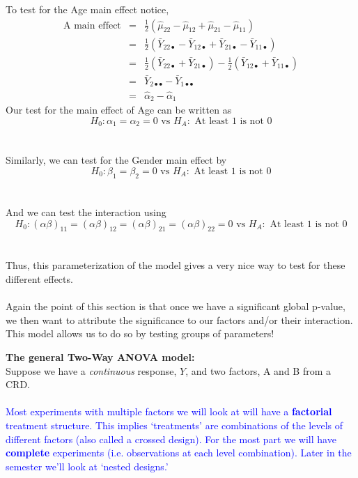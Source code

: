 To test for the Age main effect notice, 
\begin{eqnarray*}
\mbox{A main effect}&=&\frac{1}{2}(\hat{\mu}_{22}-\hat{\mu}_{12}+\hat{\mu}_{21}-\hat{\mu}_{11})\\
&= & \frac{1}{2}(\bar{Y}_{22\bullet}-\bar{Y}_{12\bullet}+\bar{Y}_{21\bullet}-\bar{Y}_{11\bullet})\\
& = & \frac{1}{2}(\bar{Y}_{22\bullet}+\bar{Y}_{21\bullet})-\frac{1}{2}(\bar{Y}_{12\bullet}+\bar{Y}_{11\bullet})\\
& = & \bar{Y}_{2\bullet\bullet}-\bar{Y}_{1\bullet\bullet} \\
&=& \hat{\alpha}_{2}-\hat{\alpha}_{1}
\end{eqnarray*}
Our test for the main effect of Age can be written as
$$H_0: \alpha_{1}=\alpha_{2}=0\mbox{ vs } H_A:\mbox{ At least 1 is not 0}$$~\\~\\
Similarly, we can test for the Gender main effect by
$$H_0: \beta_{1}=\beta_{2}=0\mbox{ vs } H_A:\mbox{ At least 1 is not 0}$$~\\~\\
And we can test the interaction using 
$$H_0: (\alpha\beta)_{11}=(\alpha\beta)_{12}=(\alpha\beta)_{21}=(\alpha\beta)_{22}=0\mbox{ vs } H_A:\mbox{ At least 1 is not 0}$$~\\~\\
Thus, this parameterization of the model gives a very nice way to test for these different effects.\\~\\
Again the point of this section is that once we have a significant global p-value, we then want to attribute the significance to our factors and/or their interaction.  This model allows us to do so by testing groups of parameters!

\newpage

\Large\textbf{The general Two-Way ANOVA model:}\large\\
Suppose we have a \textit{continuous} response, $Y$, and two factors, A and B from a CRD. \\~\\

\textcolor{blue}{Most experiments with multiple factors we will look at will have a \textbf{factorial} treatment structure.  This implies `treatments' are combinations of the levels of different factors (also called a crossed design).  For the most part we will have \textbf{complete} experiments (i.e. observations at each level combination).  Later in the semester we'll look at `nested designs.'}

